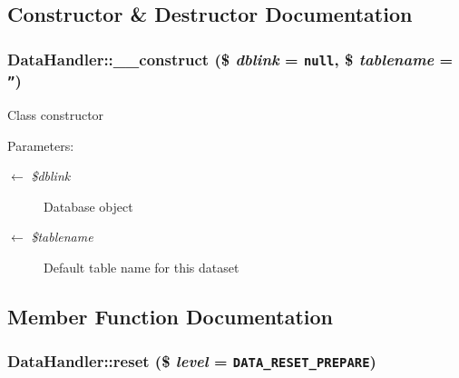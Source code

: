 \subsection{Constructor \& Destructor Documentation}
\hypertarget{classDataHandler_4eef16167dd9a5bc94bd0cb40ce1b180}{
\subsubsection{\setlength{\rightskip}{0pt plus 5cm}DataHandler::\_\-\_\-construct (\$ {\em dblink} = {\tt null}, \$ {\em tablename} = {\tt ''})}}
\label{classDataHandler_4eef16167dd9a5bc94bd0cb40ce1b180}


Class constructor \begin{Desc}
\item[Parameters:]
\begin{description}
\item[\mbox{$\leftarrow$} {\em \$dblink}]Database object \item[\mbox{$\leftarrow$} {\em \$tablename}]Default table name for this dataset \end{description}
\end{Desc}


\subsection{Member Function Documentation}
\hypertarget{classDataHandler_b89e1aaad9cd0a37f1c7f13c1d9c0d57}{
\subsubsection{\setlength{\rightskip}{0pt plus 5cm}DataHandler::reset (\$ {\em level} = {\tt {\bf DATA\_\-RESET\_\-PREPARE}})}}
\label{classDataHandler_b89e1aaad9cd0a37f1c7f13c1d9c0d57}


